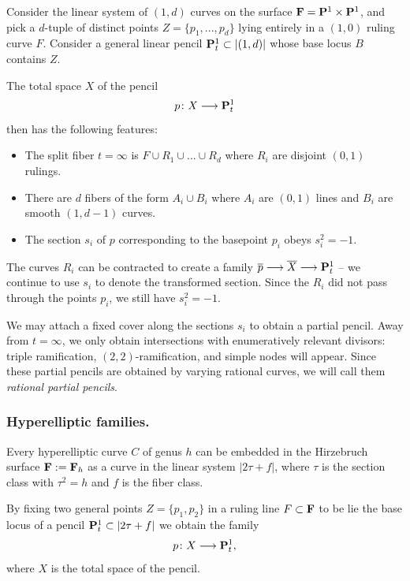 \documentclass[reqno, 10 pt]{article}
\theoremstyle{definition}
\theoremstyle{remark}
\numberwithin{equation}{section}
\numberwithin{thm}{section}
\numberwithin{prop}{section}
\numberwithin{lem}{section}
\numberwithin{cor}{section}
\numberwithin{conj}{section}
\numberwithin{defn}{section}
\newcommand{\F}{{\mathbf F}}
\renewcommand{\to}{\longrightarrow}
\renewcommand{\P}{{\bf P}}
\renewcommand{\F}{{\bf F}}
\newcommand {\from}{{\colon}}
\begin{document}
    Consider the linear system of $(1,d)$ curves on the surface $\F = {\bf P}^1 \times {\bf P}^1$, and pick a $d$-tuple of distinct points $Z = \{p_{1}, ... ,p_{d}\}$ lying entirely in a $(1,0)$ ruling curve $F$.  Consider a general linear pencil ${\bf P}^1_{t} \subset |(1,d)|$  whose base locus $B$ contains $Z$. 

    The total space $X$ of the pencil $$p \colon X \longrightarrow {\bf P}^1_{t}$$ then has the following features: 
    \begin{itemize}
    \item The split fiber $t=\infty$ is $F \cup R_{1} \cup ... \cup R_{d}$ where $R_{i}$ are disjoint $(0,1)$ rulings. 
    \item There are $d$ fibers of the form $A_{i} \cup B_{i}$ where $A_{i}$ are $(0,1)$ lines and $B_{i}$ are smooth $(1,d-1)$ curves.
    \item The section $s_{i}$ of $p$
    corresponding to the basepoint $p_{i}$ obeys $s_{i}^{2} = -1$.
    \end{itemize}

    The curves $R_{i}$ can be contracted to create a family $\o{p} \to \o{X} \to \P^{1}_{t}$ -- we continue to use $s_{i}$ to denote the transformed section.  Since the $R_{i}$ did not pass through the points $p_{i}$, we still have $s_{i}^{2} = -1$.


 
    We may attach a fixed cover along the sections $s_{i}$ to obtain a partial pencil.    Away from $t= \infty$, we only obtain intersections with enumeratively relevant divisors: triple ramification, $(2,2)$-ramification, and simple nodes will appear.  Since these partial pencils are obtained by varying rational curves, we will call them {\sl rational partial pencils}.
 
 \subsubsection{Hyperelliptic families.}\label{hfamilies} 

    Every hyperelliptic curve $C$ of genus $h$ can be embedded in the Hirzebruch surface $\F := \F_{h}$ as a curve in the linear system $|2 \tau + f|$, where $\tau$ is the section class with $\tau^{2} = h$ and $f$ is the fiber class.  

    By fixing two general points $Z = \{p_{1}, p_{2}\}$ in a ruling line $F \subset \F$  to be lie the base locus of a pencil $\P^{1}_{t} \subset |2\tau + f|$ we obtain the family \[p \from X \to \P^{1}_{t},\] where $X$ is the total space of the pencil. 
\end{document}
